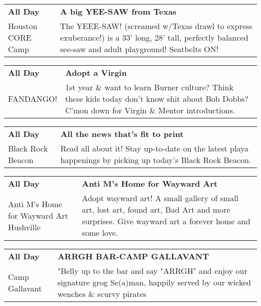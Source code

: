 \begin{tabular}{ p{1in} p{2.2in} }
    \textbf{All Day} & \textbf{A big YEE-SAW from Texas} \\
    Houston CORE Camp \newline  & The YEEE-SAW! (screamed w/Texas drawl to express exuberance!) is a 33' long, 28' tall, perfectly balanced see-saw and adult playground! Seatbelts ON! \\
    \hline 
\end{tabular}
    
\begin{tabular}{ p{1in} p{2.2in} }
    \textbf{All Day} & \textbf{Adopt a Virgin} \\
    FANDANGO! \newline  & 1st year \& want to learn Burner culture? Think these kids today don't know shit about Bob Dobbs? C'mon down for Virgin \& Mentor introductions. \\
    \hline 
\end{tabular}
    
\begin{tabular}{ p{1in} p{2.2in} }
    \textbf{All Day} & \textbf{All the news that's fit to print} \\
    Black Rock Beacon \newline  & Read all about it! Stay up-to-date on the latest playa happenings by picking up today's Black Rock Beacon. \\
    \hline 
\end{tabular}
    
\begin{tabular}{ p{1in} p{2.2in} }
    \textbf{All Day} & \textbf{Anti M's Home for Wayward Art} \\
    Anti M's Home for Wayward Art \newline Hushville & Adopt wayward art! A small gallery of small art, lost art, found art, Bad Art and more surprises.  Give wayward art a forever home and some love. \\
    \hline 
\end{tabular}
    
\begin{tabular}{ p{1in} p{2.2in} }
    \textbf{All Day} & \textbf{ARRGH BAR-CAMP GALLAVANT} \\
    Camp Gallavant \newline  & "Belly up to the bar and say "ARRGH" and enjoy our signature grog Se(a)man, happily served by our wicked wenches \& scurvy pirates \\
    \hline 
\end{tabular}
    
